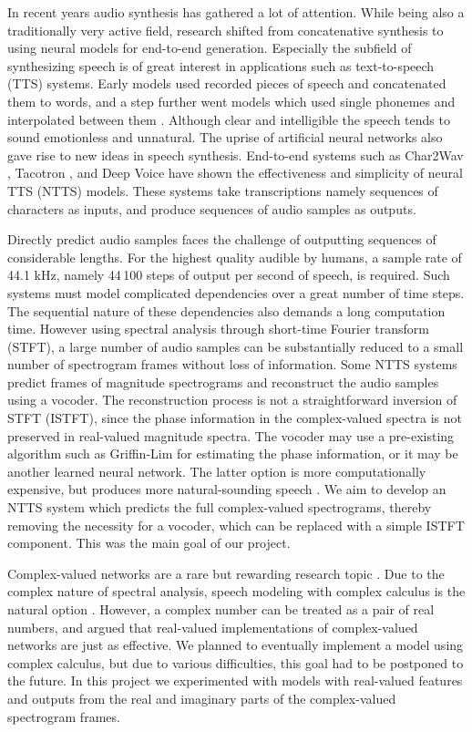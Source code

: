 \documentclass[11pt]{article}
\begin{document}
In recent years audio synthesis has gathered a lot of attention.
While being also a traditionally very active field,
research shifted from concatenative synthesis to using neural models
for end-to-end generation.
Especially the subfield of synthesizing speech is of great interest
in applications such as text-to-speech (TTS) systems.
Early models used recorded pieces of speech and concatenated them to words,
and a step further went models which used single phonemes and interpolated between them
\parencite{taylor2009text}.
Although clear and intelligible the speech tends to sound emotionless and unnatural.
The uprise of artificial neural networks also gave rise to new ideas in speech synthesis.
End-to-end systems such as Char2Wav \parencite{sotelo2017char2wav},
Tacotron \parencite{wang2017tacotron}, and Deep Voice \parencite{arik2017deep}
have shown the effectiveness and simplicity of neural TTS (NTTS) models.
These systems take transcriptions namely sequences of characters as inputs,
and produce sequences of audio samples as outputs.

Directly predict audio samples faces the challenge of outputting sequences of considerable lengths.
For the highest quality audible by humans, a sample rate of 44.1 kHz,
namely 44\,100 steps of output per second of speech, is required.
Such systems must model complicated dependencies over a great number of time steps.
The sequential nature of these dependencies also demands a long computation time.
However using spectral analysis through short-time Fourier transform (STFT),
a large number of audio samples can be substantially reduced to a small number of spectrogram frames
without loss of information.
Some NTTS systems predict frames of magnitude spectrograms
and reconstruct the audio samples using a vocoder.
The reconstruction process is not a straightforward inversion of STFT (ISTFT),
since the phase information in the complex-valued spectra is not preserved in real-valued magnitude spectra.
The vocoder may use a pre-existing algorithm such as Griffin-Lim \parencite{griffin1984signal}
for estimating the phase information, or it may be another learned neural network.
The latter option is more computationally expensive,
but produces more natural-sounding speech \parencite{shen2018natural}.
We aim to develop an NTTS system which predicts the full complex-valued spectrograms,
thereby removing the necessity for a vocoder,
which can be replaced with a simple ISTFT component.
This was the main goal of our project.

Complex-valued networks are a rare but rewarding research topic \parencite{trabelsi2017deep}.
Due to the complex nature of spectral analysis,
speech modeling with complex calculus is the natural option
\parencite{hu2016initial, fu2017complex, nakashika2018complex}.
However, a complex number can be treated as a pair of real numbers,
and \textcite{drude2016appropriateness} argued that real-valued implementations
of complex-valued networks are just as effective.
We planned to eventually implement a model using complex calculus,
but due to various difficulties, this goal had to be postponed to the future.
In this project we experimented with models with real-valued features and outputs
from the real and imaginary parts of the complex-valued spectrogram frames.
\end{document}
